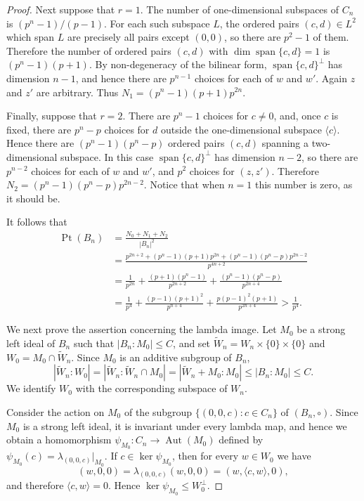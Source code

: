 \documentclass[11pt, oneside]{amsart}
\numberwithin{equation}{section}
\theoremstyle{plain}
\theoremstyle{definition}
\newcommand{\Pt}{\operatorname{Pt} }
\newcommand{\Aut}{\operatorname{Aut} }
\begin{document}
\begin{proof}
Next suppose that $r=1$. The number of one-dimensional subspaces of $C_n$ is
$(p^n-1)/(p-1)$. For each such subspace $L$, the ordered pairs
$(c,d)\in L^2$ which span $L$ are precisely all pairs except $(0,0)$, so there are
$p^2-1$ of them. Therefore the number of ordered pairs $(c,d)$ with
$\dim\operatorname{span}\{c,d\}=1$ is
$(p^n-1)(p+1)$. By non-degeneracy of the bilinear form,
$\operatorname{span}\{c,d\}^{\perp}$ has dimension $n-1$, and hence there are
$p^{n-1}$ choices for each of $w$ and $w'$. Again $z$ and $z'$ are arbitrary. Thus
$N_1=(p^n-1)(p+1)p^{2n}$.

Finally, suppose that $r=2$. There are $p^n-1$ choices for $c\neq0$, and, once $c$ is fixed, there are $p^n-p$ choices for $d$ outside the one-dimensional subspace $\langle c\rangle$. Hence there are
$(p^n-1)(p^n-p)$ ordered pairs $(c,d)$ spanning a two-dimensional subspace. In this case
$\operatorname{span}\{c,d\}^{\perp}$ has dimension $n-2$, so there are
$p^{n-2}$ choices for each of $w$ and $w'$, and $p^2$ choices for $(z,z')$. Therefore
$N_2=(p^n-1)(p^n-p)p^{2n-2}$.
Notice that when $n=1$ this number is zero, as it should be.

It follows that
$$
\begin{aligned}
\Pt(B_n)
&=\frac{N_0+N_1+N_2}{|B_n|^2}\\
&=\frac{p^{2n+2}+(p^n-1)(p+1)p^{2n}
 +(p^n-1)(p^n-p)p^{2n-2}}{p^{4n+2}}\\
&= \frac{1}{p^{2n}}
 +\frac{(p+1)(p^n-1)}{p^{2n+2}}
 +\frac{(p^n-1)(p^n-p)}{p^{2n+4}}\\
&=\frac1{p^4}
 +\frac{(p-1)(p+1)^2}{p^{n+4}}
 +\frac{p(p-1)^2(p+1)}{p^{2n+4}}
>\frac1{p^4}.
\end{aligned}
$$

We next prove the assertion concerning the lambda image. Let $M_0$ be a strong left ideal of $B_n$ such that $|B_n:M_0|\leqslant C$, and set
$\widetilde W_n=W_n\times\{0\}\times\{0\}$ and
$W_0=M_0 \cap \widetilde W_n$. Since $M_0$ is an additive subgroup of $B_n$,
$$
|\widetilde W_n:W_0|
=|\widetilde W_n:\widetilde W_n\cap M_0|
=|\widetilde W_n+M_0:M_0|
\leqslant |B_n:M_0|
\leqslant C.
$$
We identify $W_0$ with the corresponding subspace of $W_n$.

Consider the action on $M_0$ of the subgroup
$\{(0,0,c):c\in C_n\}$ of $(B_n,\circ)$. Since $M_0$ is a strong left ideal, it is invariant under every lambda map, and hence we obtain a homomorphism
$\psi_{M_0}:C_n\to\Aut(M_0)$ defined by
$\psi_{M_0}(c)=\lambda_{(0,0,c)}|_{M_0}$.
If $c\in\ker\psi_{M_0}$, then for every $w\in W_0$ we have
$$
(w,0,0)
=\lambda_{(0,0,c)}(w,0,0)
=(w,\langle c,w\rangle,0),
$$
and therefore $\langle c,w\rangle=0$. Hence
$\ker\psi_{M_0}\leqslant W_0^\perp$.


\end{proof}
\end{document}
